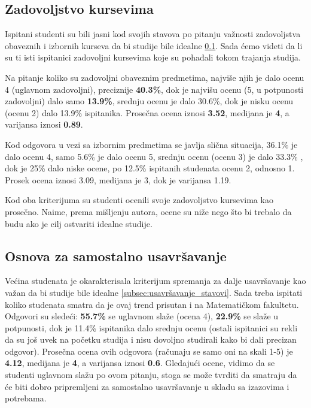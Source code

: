 \documentclass[a4paper]{article}
\begin{document}
{\subsection{Zadovoljstvo kursevima}
\label{subsec:zadovoljstvo_iskustva}
Ispitani studenti su bili jasni kod svojih stavova po pitanju važnosti zadovoljstva obaveznih i izbornih kurseva da bi studije bile idealne \ref{subsec:zadovoljstvo_iskustva}. Sada ćemo videti da li su ti isti ispitanici zadovoljni kursevima koje su pohađali tokom trajanja studija.

Na pitanje koliko su zadovoljni obaveznim predmetima, najviše njih je dalo ocenu 4 (uglavnom zadovoljni), preciznije \textbf{40.3\%}, dok je najvišu ocenu (5, u potpunosti zadovoljni) dalo samo \textbf{13.9\%}, srednju ocenu je dalo 30.6\%, dok je nisku ocenu (ocenu 2) dalo 13.9\% ispitanika. Prosečna ocena iznosi \textbf{3.52}, medijana je \textbf{4}, a varijansa iznosi  \textbf{0.89}.

Kod odgovora u vezi sa izbornim predmetima se javlja slična situacija, 36.1\% je dalo ocenu 4, samo 5.6\% je dalo ocenu 5, srednju ocenu (ocenu 3) je dalo 33.3\% , dok je 25\% dalo niske ocene, po 12.5\% ispitanih studenata ocenu 2, odnosno 1. Prosek ocena iznosi 3.09, medijana je 3, dok je varijansa 1.19. 

Kod oba kriterijuma su studenti ocenili svoje zadovoljstvo kursevima kao prosečno. Naime, prema mišljenju autora, ocene su niže nego što bi trebalo da budu ako je cilj ostvariti idealne studije.

\subsection{Osnova za samostalno usavršavanje}
\label{subsec:usavršavanje_iskustva}
Većina studenata je okarakterisala kriterijum spremanja za dalje usavršavanje kao važan da bi studije bile idealne \ref{subsec:usavršavanje_stavovi}. Sada treba ispitati koliko studenata smatra da je ovaj trend prisutan i na Matematičkom fakultetu.
Odgovori su sledeći: \textbf{55.7\%} se uglavnom slaže (ocena 4), \textbf{22.9\%} se slaže u potpunosti, dok je 11.4\% ispitanika dalo srednju ocenu (ostali ispitanici su rekli da su još uvek na početku studija i nisu dovoljno studirali kako bi dali precizan odgovor). Prosečna ocena ovih odgovora (računaju se samo oni na skali 1-5) je \textbf{4.12}, medijana je \textbf{4}, a varijansa iznosi \textbf{0.6}. Gledajući ocene, vidimo da se studenti uglavnom slažu po ovom pitanju, stoga se može tvrditi da smatraju da će biti dobro pripremljeni za samostalno usavršavanje u skladu sa izazovima i potrebama.


}
\end{document}
